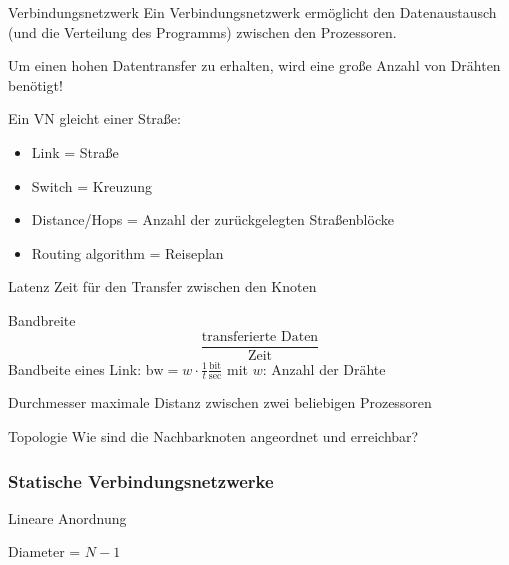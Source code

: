 \begin{defi}{Verbindungsnetzwerk}
    Ein Verbindungsnetzwerk ermöglicht den Datenaustausch (und die Verteilung des Programms) zwischen den Prozessoren.
    
    Um einen hohen Datentransfer zu erhalten, 
    wird eine große Anzahl von Drähten benötigt!
    
    Ein VN gleicht einer Straße:
    \begin{itemize}
        \item Link = Straße
        \item Switch = Kreuzung
        \item Distance/Hops = Anzahl der zurückgelegten Straßenblöcke
        \item Routing algorithm = Reiseplan
    \end{itemize}
    
\end{defi}

\begin{defi}[Verbindungsnetzwerk]{Latenz}
    Zeit für den Transfer zwischen den Knoten
\end{defi}

\begin{defi}[Verbindungsnetzwerk]{Bandbreite}
    \[\frac{\text{transferierte Daten}}{\text{Zeit}}\]
    Bandbeite eines Link: $\text{bw} = w \cdot \frac{1}{t}\frac{\text{bit}}{\text{sec}}$
    mit $w$: Anzahl der Drähte
\end{defi}

\begin{defi}[Verbindungsnetzwerk]{Durchmesser}
    maximale Distanz zwischen zwei beliebigen Prozessoren
\end{defi}

\begin{defi}[Verbindungsnetzwerk]{Topologie}
    Wie sind die Nachbarknoten angeordnet und erreichbar?
\end{defi}

\subsubsection{Statische Verbindungsnetzwerke}

\begin{defi}{Lineare Anordnung}
    \begin{center}
        Diameter = $N-1$
    \end{center}
\end{defi}

